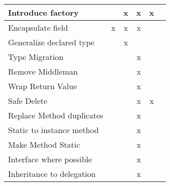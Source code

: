 \begin{table}[htbp]
\begin{tabular}{|l|c|c|c|c|c|}
Introduce factory         &               & x       & x        & x        &          \\ \hline
Encapsulate field         & x             & x       & x        &          &          \\ \hline
Generalize declared type  &               & x       &          &          &          \\ \hline
Type Migration            &               &         & x        &          &          \\ \hline
Remove Middleman          &               &         & x        &          &          \\ \hline
Wrap Return Value         &               &         & x        &          &          \\ \hline
Safe Delete               &               &         & x        & x        &          \\ \hline
Replace Method duplicates &               &         & x        &          &          \\ \hline
Static to instance method &               &         & x        &          &          \\ \hline
Make Method Static        &               &         & x        &          &          \\ \hline
Interface where possible  &               &         & x        &          &          \\ \hline
Inheritance to delegation &               &         & x        &          &          \\ \hline
\end{tabular}
\end{table}

